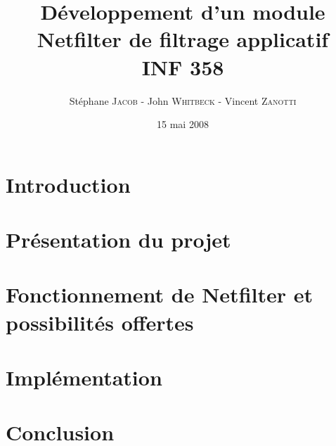 \documentclass[a4paper,12pt]{article}
\title{Développement d’un module Netfilter de filtrage applicatif\\INF 358}
\author{Stéphane \textsc{Jacob} - John \textsc{Whitbeck} - Vincent \textsc{Zanotti}}
\date{15 mai 2008}
\begin{document}
\maketitle

\section*{Introduction}


\section{Présentation du projet}

\newpage

\section{Fonctionnement de Netfilter et possibilités offertes}

\newpage

\section{Implémentation}


\section*{Conclusion}


\nocite{RW}
\nocite{C}
\nocite{S}

\newpage
{}

\end{document}
